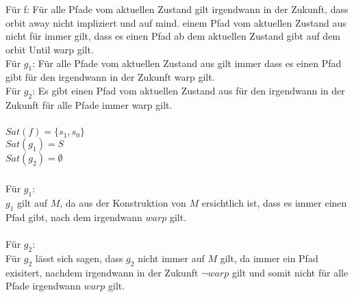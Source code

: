\documentclass[a4paper,12pt]{scrartcl}
\title{\blatt}
\date{Gruppe 06}
\author{Sabrina Buczko 6663234, Julian Deinert 6535880, Rafael Heid 6704828}
\begin{document}
\maketitle
\newpage
\setcounter{section}{4}
\section{}
\setcounter{subsection}{2}
\subsection{}
\subsubsection{}

\subsubsection{}
Für f: Für alle Pfade vom aktuellen Zustand gilt irgendwann in der Zukunft, dass orbit away nicht impliziert und auf mind. einem Pfad vom aktuellen Zustand aus nicht für immer gilt, dass es einen Pfad ab dem aktuellen Zustand gibt auf dem orbit Until warp gilt.\\
Für $g_1$: Für alle Pfade vom aktuellen Zustand aus gilt immer dass es einen Pfad gibt für den irgendwann in der Zukunft warp gilt.\\
Für $g_2$: Es gibt einen Pfad vom aktuellen Zustand aus für den irgendwann in der Zukunft für alle Pfade immer warp gilt.

\subsubsection{}
$Sat(f)= \{s_1, s_0\}$\\
$Sat(g_1)= S$\\
$Sat(g_2)= \emptyset$
\subsubsection{}
Für $g_1$:\\
$g_1$ gilt auf $M$, da aus der Konstruktion von $M$ ersichtlich ist, 
dass es immer einen Pfad gibt, nach dem irgendwann $warp$ gilt.\\\\
Für $g_2$:\\
Für $g_2$ lässt sich sagen, dass $g_2$ nicht immer auf $M$ gilt, da immer ein Pfad exisitert, nachdem irgendwann in der Zukunft $\neg warp$ gilt und somit nicht für alle Pfade irgendwann $warp$ gilt.
\end{document}
